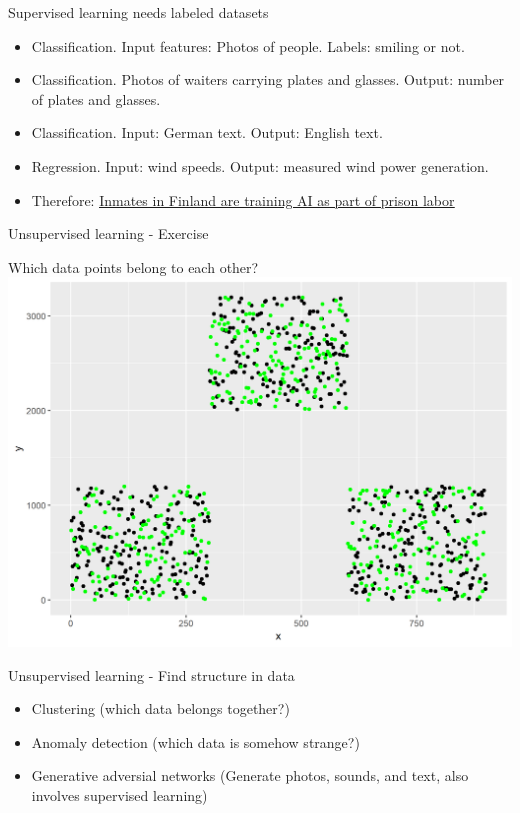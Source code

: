 \documentclass[color=usenames,dvipsnames]{beamer}
\begin{document}
\begin{frame}{Supervised learning needs labeled datasets} 

\begin{itemize}
	\item Classification. Input features: Photos of people. Labels: smiling or not.
	\item Classification. Photos of waiters carrying plates and glasses. Output: number of plates and glasses.
    \item Classification. Input: German text. Output: English text.
	\item Regression. Input: wind speeds. Output: measured wind power generation.
	\item Therefore: 
		\href{https://www.theverge.com/2019/3/28/18285572/prison-labor-finland-artificial-intelligence-data-tagging-vainu}{\underline{Inmates in Finland are training AI as part of prison labor}}
\end{itemize}

\end{frame}


\begin{frame}{Unsupervised learning - Exercise} 

\begin{center}
	Which data points belong to each other?\\
\includegraphics[width=0.8\linewidth]{../figures/clustering.png}
\end{center}


\end{frame}

\begin{frame}{Unsupervised learning - Find structure in data} 

\begin{itemize}
	\item Clustering (which data belongs together?)
	\item Anomaly detection (which data is somehow strange?)
	\item Generative adversial networks (Generate photos, sounds, and text, also involves supervised learning)
\end{itemize}

\end{frame}
\end{document}
